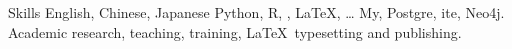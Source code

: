 
\begin{rubric}{Skills}
\entry*[Languages]
	English, Chinese, Japanese
 Python, R, , \LaTeX, \ldots
\entry*[Databases]
	My, Postgre, ite, Neo4j.
\entry*[Misc.]
	Academic research, teaching, training, \LaTeX\ typesetting and publishing.
\end{rubric}
